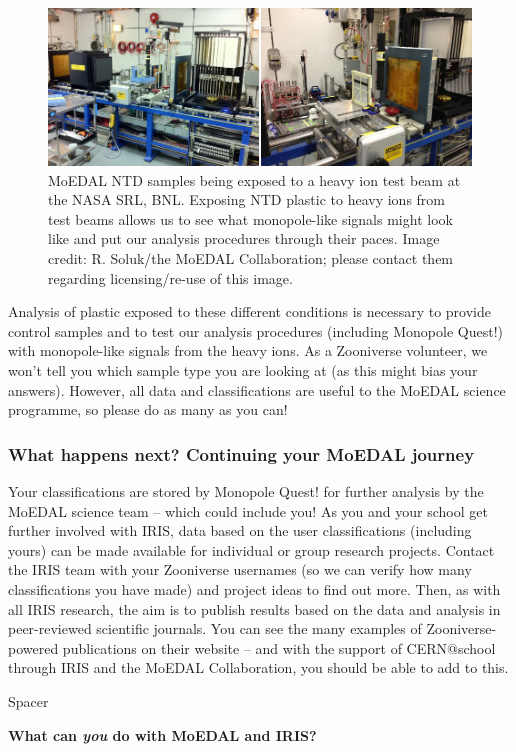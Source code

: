 %
\begin{figure}[htbp]
  \centering
  \includegraphics[width=1.0\textwidth]{assets/images/bnltestbeam/bnltestbeam.jpg}
  \caption[MoEDAL NTD samples in the BNL test beam]
  {\label{fig:bnltestbeam}\ac{MoEDAL} \ac{NTD} samples being exposed to a
heavy ion test beam at the \ac{NASA} \acf{SRL}, \acf{BNL}.
Exposing \ac{NTD} plastic to heavy ions from test beams allows us to see
what monopole-like signals might look like and put our analysis procedures
through their paces.  %
Image credit: R. Soluk/the MoEDAL Collaboration; %
please contact them regarding licensing/re-use of this image.}
\end{figure}
%

Analysis of plastic exposed to these different conditions is necessary to
provide control samples and to test our analysis procedures
(including Monopole Quest!) with monopole-like signals from the heavy ions.
As a Zooniverse volunteer, we won’t tell you which sample type you are 
looking at (as this might bias your answers).
However, all data and classifications are useful to the \ac{MoEDAL}
science programme, so please do as many as you can!

\subsubsection{What happens next? Continuing your MoEDAL journey}
\label{sec:mqnext}
Your classifications are stored by Monopole Quest! for further analysis
by the \ac{MoEDAL} science team -- which could include you!
As you and your school get further involved with \ac{IRIS},
data based on the user classifications (including yours) can be made 
available for individual or group research projects.
Contact the \ac{IRIS} team with your Zooniverse usernames
(so we can verify how many classifications you have made)
and project ideas to find out more.
Then, as with all \ac{IRIS} research,
the aim is to publish results based on the data and analysis in
peer-reviewed scientific journals.
You can see the many examples of Zooniverse-powered publications on their
website -- and with the support of CERN@school through IRIS
and the MoEDAL Collaboration, you should be able to add to this.

{\color{white}Spacer}
\\[1cm]

\begin{center}
\textbf{What can {\em you} do with \ac{MoEDAL} and \ac{IRIS}?}
\end{center}
